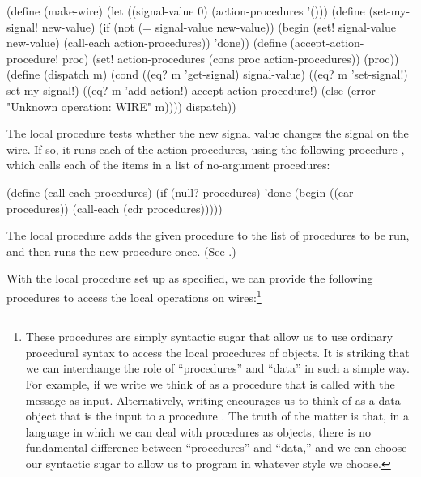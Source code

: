 \begin{codeBlock}
(define (make-wire)
  (let ((signal-value 0) (action-procedures '()))
    (define (set-my-signal! new-value)
      (if (not (= signal-value new-value))
          (begin (set! signal-value new-value)
            (call-each action-procedures))
          'done))
    (define (accept-action-procedure! proc)
      (set! action-procedures
            (cons proc action-procedures))
      (proc))
    (define (dispatch m)
      (cond ((eq? m 'get-signal) signal-value)
            ((eq? m 'set-signal!) set-my-signal!)
            ((eq? m 'add-action!)
             accept-action-procedure!)
            (else
              (error "Unknown operation: WIRE"
                     m))))
    dispatch))
\end{codeBlock}

\noindent
The local procedure  tests whether the new signal value
changes the signal on the wire.  If so, it runs each of the action procedures,
using the following procedure , which calls each of the items
in a list of no-argument procedures:

\begin{codeBlock}
(define (call-each procedures)
  (if (null? procedures)
      'done
      (begin ((car procedures))
             (call-each (cdr procedures)))))
\end{codeBlock}

\noindent
The local procedure  adds the given procedure to
the list of procedures to be run, and then runs the new procedure once.  (See
.)

With the local  procedure set up as specified, we can provide
the following procedures to access the local operations on
wires:\footnote{\label{Footnote 27} These procedures are simply
syntactic sugar that allow us to use ordinary procedural syntax to access the
local procedures of objects.  It is striking that we can interchange the role
of ``procedures'' and ``data'' in such a simple way.  For example, if we write
 we think of  as a procedure that is called
with the message  as input.  Alternatively, writing
 encourages us to think of  as a data object
that is the input to a procedure .  The truth of the matter is
that, in a language in which we can deal with procedures as objects, there is
no fundamental difference between ``procedures'' and ``data,'' and we can
choose our syntactic sugar to allow us to program in whatever style we choose.}

